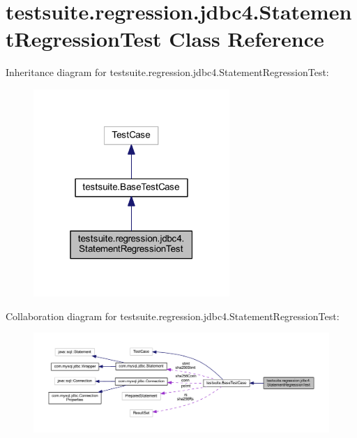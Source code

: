 \hypertarget{classtestsuite_1_1regression_1_1jdbc4_1_1_statement_regression_test}{}\section{testsuite.\+regression.\+jdbc4.\+Statement\+Regression\+Test Class Reference}
\label{classtestsuite_1_1regression_1_1jdbc4_1_1_statement_regression_test}


Inheritance diagram for testsuite.\+regression.\+jdbc4.\+Statement\+Regression\+Test\+:
\nopagebreak
\begin{figure}[H]
\begin{center}
\leavevmode
\includegraphics[width=211pt]{classtestsuite_1_1regression_1_1jdbc4_1_1_statement_regression_test__inherit__graph}
\end{center}
\end{figure}


Collaboration diagram for testsuite.\+regression.\+jdbc4.\+Statement\+Regression\+Test\+:
\nopagebreak
\begin{figure}[H]
\begin{center}
\leavevmode
\includegraphics[width=350pt]{classtestsuite_1_1regression_1_1jdbc4_1_1_statement_regression_test__coll__graph}
\end{center}
\end{figure}
